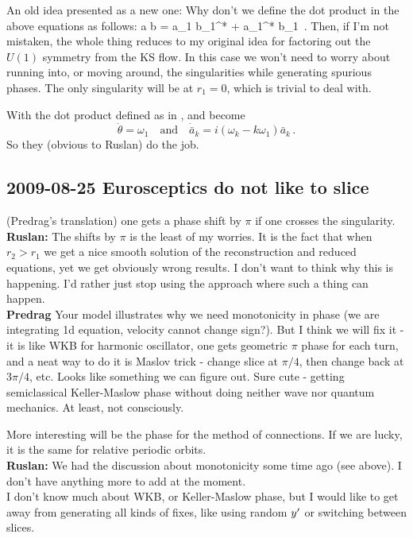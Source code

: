 \vspace{2ex}
An old idea presented as a new one:  Why don't we define the dot product in the above equations as follows:
\beq
 a \cdot b = a_1 b_1^* + a_1^* b_1
 \,.
Then, if I'm not mistaken, the whole thing reduces to my original idea for factoring out the $U(1)$ symmetry from the KS flow.  In this case we won't need to worry about running into, or moving around, the singularities while generating spurious phases.  The only singularity will be at $r_1 = 0$, which is trivial to deal with.

With the dot product defined as in ,
 and  become
\[
  \dot{\theta} = \omega_1
  \quad \mathrm{and} \quad
  \dot{\bar{a}}_k = i(\omega_k - k\omega_1) \bar{a}_k
\,.
\]
So they (obvious to Ruslan) do the job.


\subsection{2009-08-25 Eurosceptics do not like to slice}
 (Predrag's translation) one gets a
phase shift by $\pi$ if one crosses the singularity.
\\
{\bf Ruslan:} The shifts by $\pi$ is the least of my worries.
It is the fact that when $r_2 > r_1$ we get a nice smooth
solution of the reconstruction and reduced equations, yet we
get obviously wrong results.  I don't want to think why this
is happening.  I'd rather just stop using the approach where
such a thing can happen.
\\
{\bf Predrag} Your model illustrates why we need
monotonicity in phase (we are integrating 1d equation,
velocity cannot change sign?). But I think we will fix it -
it is like WKB for harmonic oscillator, one gets geometric
$\pi$ phase for each turn, and a neat way to do it is Maslov
trick - change slice at $\pi/4$, then change back at
$3\pi/4$, etc. Looks like something we can figure out. Sure
cute - getting semiclassical Keller-Maslow phase without
doing neither wave nor quantum mechanics. At least, not
consciously.

More interesting will be the phase for the method of
connections. If we are lucky, it is the same for relative
periodic orbits.
\\
{\bf Ruslan:} We had the discussion about monotonicity some
time ago (see above).  I don't have anything more to add at
the moment.
\\
I don't know much about WKB, or Keller-Maslow
phase, but I would like to get away from generating all kinds
of fixes, like using random ${y'}$ or switching between
slices.

